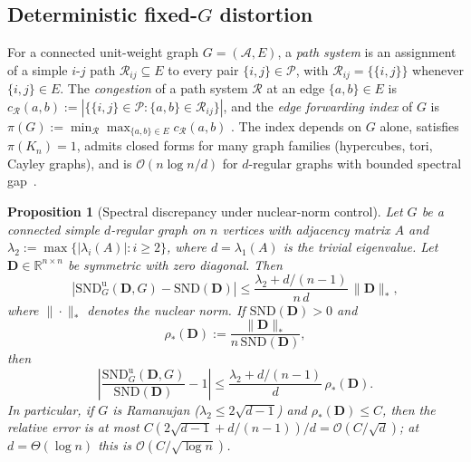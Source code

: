 \documentclass{article}
\theoremstyle{plain}
\newtheorem{proposition}[theorem]{Proposition}
\theoremstyle{definition}
\theoremstyle{remark}
\newcommand{\R}{\mathbb{R}}
\newcommand{\Agents}{\mathcal{A}}        %
\newcommand{\Pairs}{\mathcal{P}}         %
\newcommand{\SND}{\ensuremath{\mathrm{SND}}}
\newcommand{\SNDG}{\mathrm{SND}_{G}}
\newcommand{\abs}[1]{\left\lvert #1 \right\rvert}
\begin{document}
\subsection*{Deterministic fixed-$G$ distortion}
\label{app:distortion}

For a connected unit-weight graph $G=(\Agents,E)$, a \emph{path system}
is an assignment of a simple $i$-$j$ path $\mathcal{R}_{ij}\subseteq E$
to every pair $\{i,j\}\in\Pairs$, with
$\mathcal{R}_{ij}=\{\{i,j\}\}$ whenever $\{i,j\}\in E$. The
\emph{congestion} of a path system $\mathcal{R}$ at an edge
$\{a,b\}\in E$ is
$c_{\mathcal{R}}(a,b):=\abs{\{\{i,j\}\in\Pairs :
\{a,b\}\in\mathcal{R}_{ij}\}}$, and the \emph{edge forwarding index} of
$G$ is
$\pi(G):=\min_{\mathcal{R}} \max_{\{a,b\}\in E} c_{\mathcal{R}}(a,b)$
\citep{chung1987forwarding,heydemann1989forwarding}. The index depends
on $G$ alone, satisfies $\pi(K_n)=1$, admits closed forms for many
graph families (hypercubes, tori, Cayley graphs), and is
$\mathcal{O}(n\log n / d)$ for $d$-regular graphs with bounded spectral
gap~\citep{leighton1999multicommodity}.

\begin{proposition}[Spectral discrepancy under nuclear-norm control]
\label{prop:spectral-nuclear-discrepancy}
Let $G$ be a connected simple $d$-regular graph on $n$ vertices with adjacency
matrix $A$ and
$\lambda_2:=\max\{|\lambda_i(A)|: i\geq 2\}$, where
$d=\lambda_1(A)$ is the trivial eigenvalue. Let
$\mathbf{D}\in\R^{n\times n}$ be symmetric with zero diagonal. Then
\begin{equation}
\label{eq:spectral-nuclear-absolute}
\abs{\SNDG^{\mathrm{u}}(\mathbf{D},G)-\SND(\mathbf{D})}
\leq
\frac{\lambda_2+d/(n-1)}{n\,d}\,\|\mathbf{D}\|_* ,
\end{equation}
where $\|\cdot\|_*$ denotes the nuclear norm. If $\SND(\mathbf{D})>0$
and
\[
\rho_*(\mathbf{D})
:=
\frac{\|\mathbf{D}\|_*}{n\,\SND(\mathbf{D})},
\]
then
\begin{equation}
\label{eq:spectral-nuclear-relative}
\abs{\frac{\SNDG^{\mathrm{u}}(\mathbf{D},G)}{\SND(\mathbf{D})}-1}
\leq
\frac{\lambda_2+d/(n-1)}{d}\,\rho_*(\mathbf{D}).
\end{equation}
In particular, if $G$ is Ramanujan
($\lambda_2\leq 2\sqrt{d-1}$) and $\rho_*(\mathbf{D})\leq C$, then the
relative error is at most
$C(2\sqrt{d-1}+d/(n-1))/d=\mathcal{O}(C/\sqrt d)$; at
$d=\Theta(\log n)$ this is
$\mathcal{O}(C/\sqrt{\log n})$.
\end{proposition}
\end{document}
